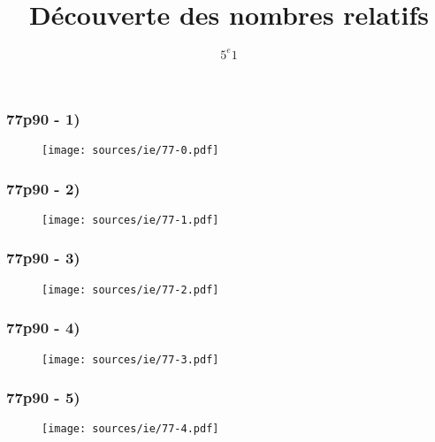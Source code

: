 \documentclass{beamer}
\title{Découverte des nombres relatifs}
\author{$5^{e}1$}
\begin{document}
\frame{\titlepage}

\begin{frame}
\frametitle{77p90 - 1)}
  \begin{figure}[H]
    \centering
    \texttt{[image: sources/ie/77-0.pdf]}
  \end{figure}
\end{frame}

\begin{frame}
\frametitle{77p90 - 2)}
  \begin{figure}[H]
    \centering
    \texttt{[image: sources/ie/77-1.pdf]}
  \end{figure}
\end{frame}

\begin{frame}
\frametitle{77p90 - 3)}
  \begin{figure}[H]
    \centering
    \texttt{[image: sources/ie/77-2.pdf]}
  \end{figure}
\end{frame}

\begin{frame}
\frametitle{77p90 - 4)}
  \begin{figure}[H]
    \centering
    \texttt{[image: sources/ie/77-3.pdf]}
  \end{figure}
\end{frame}

\begin{frame}
\frametitle{77p90 - 5)}
  \begin{figure}[H]
    \centering
    \texttt{[image: sources/ie/77-4.pdf]}
  \end{figure}
\end{frame}
\end{document}
